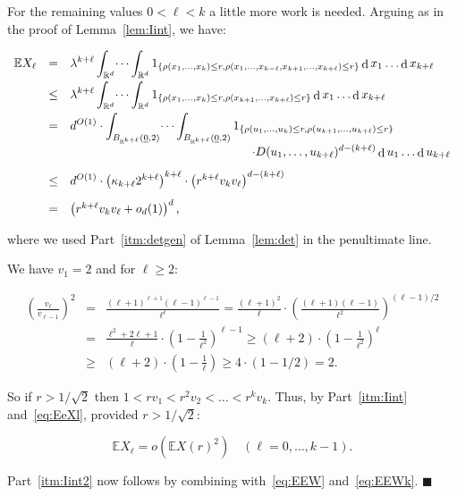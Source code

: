 \documentclass[11pt]{article}%
\newenvironment{proofof}[1]{\vspace{1ex}\noindent{\bf Proof of #1.}}{\hspace*{\fill}$\blacksquare$\vspace{1ex}}
\newcommand{\eR}[0]{\ensuremath{ \mathbb R}}
\newcommand{\Ee}[0]{\ensuremath{{\mathbb E}}}
\newcommand{\orig}{\underline{0}}
\DeclareMathOperator{\dd}{d}
\begin{document}
\begin{proofof}{Lemma~\ref{lem:Iint}}
\noindent
For the remaining values $0<\ell<k$ a little more work is needed.
Arguing as in the proof of Lemma~\ref{lem:Iint}, we have:

\begin{equation}\label{eq:EeXl} \begin{array}{rcl} 
\Ee X_\ell 
& = & \displaystyle 
\lambda^{k+\ell} 
\int_{\eR^d}\dots\int_{\eR^d} 
1_{\left\{\rho(x_1,\dots,x_k)\leq r,\rho(x_{1},\dots,x_{k-\ell},x_{k+1},\dots,x_{k+\ell}) \leq r\right\}}
\dd x_1\dots\dd x_{k+\ell} \\[2ex]
& \leq & \displaystyle 
\lambda^{k+\ell} 
\int_{\eR^d}\dots\int_{\eR^d} 
1_{\left\{\rho(x_1,\dots,x_k) \leq r,\rho(x_{k+1},\dots,x_{k+\ell}) \leq r\right\}}
\dd x_1\dots\dd x_{k+\ell} \\[2ex]
 & = & \displaystyle 
 d^{O(1)} 
 \cdot \int_{B_{\eR^{k+\ell}}(\orig,2)}\dots\int_{B_{\eR^{k+\ell}}(\orig,2)} 1_{\{\rho(u_1,\dots,u_k)\leq r,
 \rho(u_{k+1},\dots,u_{k+\ell})\leq r\}} \\[2ex]
 & & \displaystyle \hspace{35ex} \cdot
 D(u_1,\dots,u_{k+\ell})^{d-(k+\ell)}
 \dd u_1\dots\dd u_{k+\ell} \\[2ex]
& \leq & \displaystyle 
d^{O(1)} \cdot \left( \kappa_{k+\ell} 2^{k+\ell} \right)^{k+\ell}
\cdot \left( r^{k+\ell} v_k v_\ell \right)^{d-(k+\ell)} \\[2ex]
& = & \left( r^{k+\ell} v_k v_\ell +o_d(1) \right)^d, 
\end{array} \end{equation}

\noindent 
where we used Part~\ref{itm:detgen} of Lemma~\ref{lem:det} in the penultimate line.

We have $v_1=2$ and for $\ell \geq 2$:

$$ \begin{array}{rcl}
\displaystyle 
\left(\frac{v_\ell}{v_{\ell-1}}\right)^2
& = & \displaystyle 
\frac{(\ell+1)^{\ell+1}(\ell-1)^{\ell-1}}{\ell^\ell}
= \frac{(\ell+1)^2}{\ell} \cdot \left(\frac{(\ell+1)(\ell-1)}{\ell^2}\right)^{(\ell-1)/2} \\[2ex]
& = & \displaystyle 
\frac{\ell^2+2\ell+1}{\ell} \cdot \left(1-\frac{1}{\ell^2}\right)^{\ell-1}
\geq (\ell+2) \cdot \left(1-\frac{1}{\ell^2}\right)^\ell \\[2ex]
& \geq & \displaystyle 
(\ell+2) \cdot \left(1-\frac{1}{\ell}\right) \geq 
4 \cdot (1-1/2) = 2. 
\end{array} $$

\noindent
So if $r>1/\sqrt{2}$ then $1 < rv_1 < r^2v_2 < \dots < r^kv_k$. 
Thus, by Part~\ref{itm:Iint} and~\eqref{eq:EeXl}, 
provided $r>1/\sqrt{2}$:

$$ \Ee X_\ell = o\left( \Ee X(r)^2 \right) \quad (\ell = 0,\dots,k-1). $$

\noindent
Part~\ref{itm:Iint2} now follows by combining with~\eqref{eq:EEW} and~\eqref{eq:EEWk}.
\end{proofof}
\end{document}
